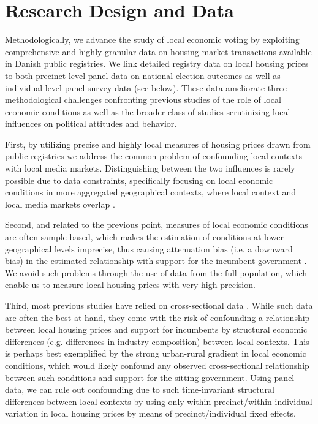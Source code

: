 \documentclass[12pt,a4paper]{article}
\begin{document}
	\section{Research Design and Data}\label{resdesign}
	Methodologically, we advance the study of local economic voting by exploiting comprehensive and highly granular data on housing market transactions available in Danish public registries. We link detailed registry data on local housing prices to both precinct-level panel data on national election outcomes as well as individual-level panel survey data (see below). These data ameliorate three methodological challenges confronting previous studies of the role of local economic conditions as well as the broader class of studies scrutinizing local influences on political attitudes and behavior.
	
	First, by utilizing precise and highly local measures of housing prices drawn from public registries we address the common problem of confounding local contexts with local media markets. Distinguishing between the two influences is rarely possible due to data constraints, specifically focusing on local economic conditions in more aggregated geographical contexts, where local context and local media markets overlap \citep[][]{bisgaard2016reconsidering}.  
	
	Second, and related to the previous point, measures of local economic conditions are often sample-based, which makes the estimation of conditions at lower geographical levels imprecise, thus causing attenuation bias (i.e. a downward bias) in the estimated relationship with support for the incumbent government \citep[][]{healy2017presidential}. We avoid such problems through the use of data from the full population, which enable us to measure local housing prices with very high precision.
	
	Third, most previous studies have relied on cross-sectional data \citep[e.g.,][]{reeves2012ecologies, ansolabehere2014mecro, books1999contextual}. While such data are often the best at hand, they come with the risk of confounding a relationship between local housing prices and support for incumbents by structural economic differences (e.g. differences in industry composition) between local contexts. This is perhaps best exemplified by the strong urban-rural gradient in local economic conditions, which would likely confound any observed cross-sectional relationship between such conditions and support for the sitting government. Using panel data, we can rule out confounding due to such time-invariant structural differences between local contexts by using only within-precinct/within-individual variation in local housing prices by means of precinct/individual fixed effects.
	
\end{document}
